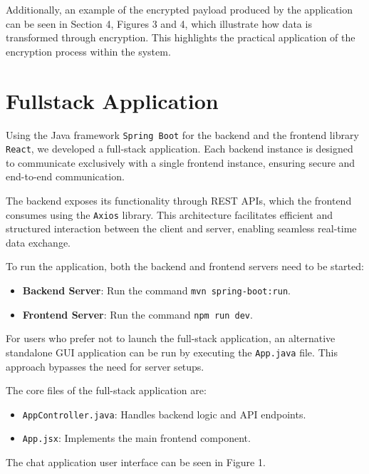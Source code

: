 \documentclass{article}
\begin{document}
Additionally, an example of the encrypted payload produced by the application can be seen in Section 4, Figures 3 and 4, which illustrate how data is transformed through encryption. This highlights the practical application of the encryption process within the system.

\section{Fullstack Application}
Using the Java framework \texttt{Spring Boot} for the backend and the frontend library \texttt{React}, we developed a full-stack application. Each backend instance is designed to communicate exclusively with a single frontend instance, ensuring secure and end-to-end communication.

The backend exposes its functionality through REST APIs, which the frontend consumes using the \texttt{Axios} library. This architecture facilitates efficient and structured interaction between the client and server, enabling seamless real-time data exchange.

To run the application, both the backend and frontend servers need to be started:
\begin{itemize}
    \item \textbf{Backend Server}: Run the command \texttt{mvn spring-boot:run}.
    \item \textbf{Frontend Server}: Run the command \texttt{npm run dev}.
\end{itemize}

For users who prefer not to launch the full-stack application, an alternative standalone GUI application can be run by executing the \texttt{App.java} file. This approach bypasses the need for server setups.

The core files of the full-stack application are:
\begin{itemize}
    \item \texttt{AppController.java}: Handles backend logic and API endpoints.
    \item \texttt{App.jsx}: Implements the main frontend component.
\end{itemize}

The chat application user interface can be seen in Figure 1.
\end{document}
